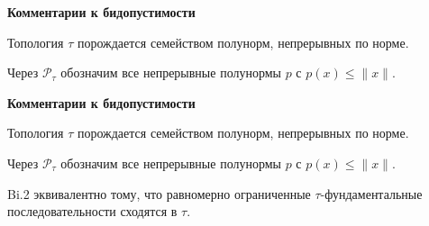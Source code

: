 \documentclass[11pt]{article}
\begin{document}
\newpage

\begin{center}
{\color{notaeYELLOW}\bfseries\fontsize{44}{52}\selectfont Комментарии к бидопустимости}
\end{center}
\vspace*{\fill}
\begin{center}
\fontsize{36}{43}\selectfont
\parbox{\linewidth}{\centering\noindent Топология $\tau$ порождается семейством полунорм, непрерывных по норме.
\par}\vspace{0.4in}
\parbox{\linewidth}{\centering\noindent Через $\mathcal{P}_\tau$ обозначим все непрерывные полунормы $p$ с $p(x)\le\|x\|$.
\par}\vspace{0.4in}
\end{center}
\vspace*{\fill}

\newpage

\begin{center}
{\color{notaeYELLOW}\bfseries\fontsize{44}{52}\selectfont Комментарии к бидопустимости}
\end{center}
\vspace*{\fill}
\begin{center}
\fontsize{36}{43}\selectfont
\parbox{\linewidth}{\centering\noindent Топология $\tau$ порождается семейством полунорм, непрерывных по норме.
\par}\vspace{0.4in}
\parbox{\linewidth}{\centering\noindent Через $\mathcal{P}_\tau$ обозначим все непрерывные полунормы $p$ с $p(x)\le\|x\|$.
\par}\vspace{0.4in}
\parbox{\linewidth}{\centering\noindent Bi.2 эквивалентно тому, что равномерно ограниченные $\tau$-фундаментальные последовательности сходятся в $\tau$.
\par}\vspace{0.4in}
\end{center}
\vspace*{\fill}

\newpage
\end{document}
